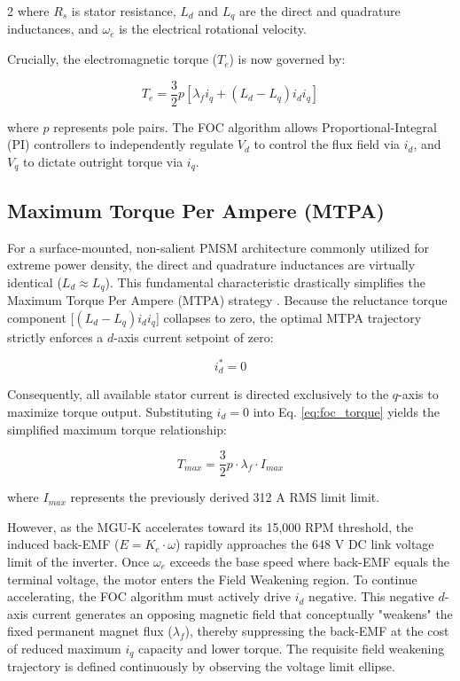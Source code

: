 \begin{multicols}{2}
where $R_s$ is stator resistance, $L_d$ and $L_q$ are the direct and quadrature inductances, and $\omega_e$ is the electrical rotational velocity.

Crucially, the electromagnetic torque ($T_e$) is now governed by:

\begin{equation} \label{eq:foc_torque}
T_e = \frac{3}{2} p [\lambda_f i_q + (L_d - L_q)i_d i_q]
\end{equation}

where $p$ represents pole pairs. The FOC algorithm allows Proportional-Integral (PI) controllers to independently regulate $V_d$ to control the flux field via $i_d$, and $V_q$ to dictate outright torque via $i_q$.

\subsection{Maximum Torque Per Ampere (MTPA)}

For a surface-mounted, non-salient PMSM architecture commonly utilized for extreme power density, the direct and quadrature inductances are virtually identical ($L_d \approx L_q$). This fundamental characteristic drastically simplifies the Maximum Torque Per Ampere (MTPA) strategy \cite{pmsm_foc_lit}. Because the reluctance torque component [$(L_d - L_q)i_d i_q$] collapses to zero, the optimal MTPA trajectory strictly enforces a $d$-axis current setpoint of zero:

\begin{equation} \label{eq:mtpa_id}
i_d^* = 0
\end{equation}

Consequently, all available stator current is directed exclusively to the $q$-axis to maximize torque output. Substituting $i_d = 0$ into Eq. \ref{eq:foc_torque} yields the simplified maximum torque relationship:

\begin{equation} \label{eq:max_torque}
T_{max} = \frac{3}{2} p \cdot \lambda_f \cdot I_{max}
\end{equation}

where $I_{max}$ represents the previously derived 312 A RMS limit limit. 

However, as the MGU-K accelerates toward its 15,000 RPM threshold, the induced back-EMF ($E = K_e \cdot \omega$) rapidly approaches the 648 V DC link voltage limit of the inverter. Once $\omega_e$ exceeds the base speed where back-EMF equals the terminal voltage, the motor enters the Field Weakening region. To continue accelerating, the FOC algorithm must actively drive $i_d$ negative. This negative $d$-axis current generates an opposing magnetic field that conceptually "weakens" the fixed permanent magnet flux ($\lambda_f$), thereby suppressing the back-EMF at the cost of reduced maximum $i_q$ capacity and lower torque. The requisite field weakening trajectory is defined continuously by observing the voltage limit ellipse.


\end{multicols}
